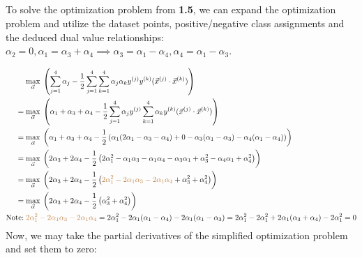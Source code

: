 \documentclass{article}
\begin{document}
\subsection{}
To solve the optimization problem from \textbf{1.5}, we can expand the optimization problem and utilize the dataset points, positive/negative class assignments and the deduced dual value relationships: $\alpha_2 = 0, \alpha_1 = \alpha_3 + \alpha_4 \implies \alpha_3 = \alpha_1 - \alpha_4, \alpha_4 = \alpha_1 - \alpha_3$.  

\begin{align*}
& \underset{\vec{\alpha}}{\text{max}}\; \left( \sum_{j=1}^4 \alpha_j - \frac{1}{2} \sum_{j=1}^4 \sum_{k=1}^4 \alpha_j \alpha_k y^{(j)} y^{(k)} (\vec{x}^{(j)} \cdot \vec{x}^{(k)} ) \right) \\
= \; & \underset{\vec{\alpha}}{\text{max}}\; \left( \alpha_1 + \alpha_3 + \alpha_4 - \frac{1}{2} \sum_{j=1}^4  \alpha_j   y^{(j)} \sum_{k=1}^4 \alpha_k y^{(k)} (\vec{x}^{(j)} \cdot \vec{x}^{(k)} ) \right) \\
= \; & \underset{\vec{\alpha}}{\text{max}}\; \left( \alpha_1 + \alpha_3 + \alpha_4 - \frac{1}{2} \left( \alpha_1(2\alpha_1 - \alpha_3 - \alpha_4) + 0 - \alpha_3 (\alpha_1 - \alpha_3) - \alpha_4 (\alpha_1 - \alpha_4     ) \right) \right) \\
= \; & \underset{\vec{\alpha}}{\text{max}}\; \left( 2 \alpha_3 + 2 \alpha_4 - \frac{1}{2} \left( 2\alpha_1^2 - \alpha_1 \alpha_3  - \alpha_1 \alpha_4 - \alpha_3 \alpha_1 + \alpha_3^2 - \alpha_4 \alpha_1 + \alpha_4^2     \right) \right) \\
= \; & \underset{\vec{\alpha}}{\text{max}}\; \left( 2 \alpha_3 + 2 \alpha_4 - \frac{1}{2} \left( \textcolor{brown}{2\alpha_1^2 - 2 \alpha_1 \alpha_3  -2 \alpha_1 \alpha_4} + \alpha_3^2  + \alpha_4^2     \right) \right) \\
= \; & \underset{\vec{\alpha}}{\text{max}}\; \left( 2 \alpha_3 + 2 \alpha_4 - \frac{1}{2} \left( \alpha_3^2  + \alpha_4^2     \right) \right) \\
\text{Note:} \; & \textcolor{brown}{2\alpha_1^2 - 2\alpha_1 \alpha_3 - 2\alpha_1 \alpha_4} = 
2 \alpha_1^2 - 2\alpha_1 (\alpha_1 - \alpha_4) - 2 \alpha_1 (\alpha_1 - \alpha_3) = 
2\alpha_1^2 - 2\alpha_1^2 + 2\alpha_1(\alpha_3 + \alpha_4) - 2\alpha_1^2 = 0 
\end{align*}
Now, we may take the partial derivatives of the simplified optimization problem and set them to zero:
\end{document}
